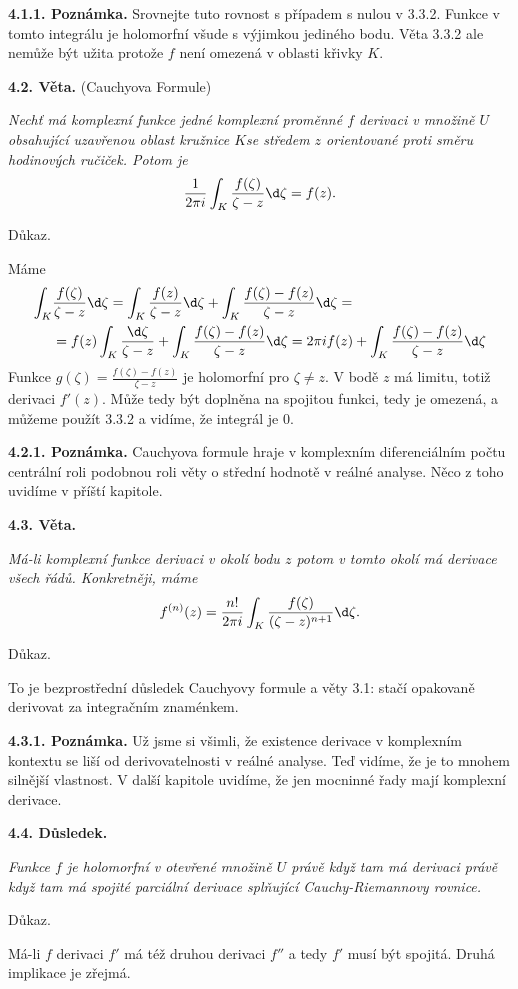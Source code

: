\documentclass[12pt]{article}
\begin{document}
\medskip

{\bf 4.1.1. Poznámka.} Srovnejte tuto rovnost s případem s nulou v 3.3.2. Funkce v tomto integrálu je holomorfní všude s výjimkou jediného bodu.  Věta 3.3.2 ale nemůže být užita protože $f$ není omezená v oblasti křivky $K$.

\bigskip

{\bf 4.2. Věta.} (Cauchyova Formule) {\em Nechť má komplexní funkce jedné komplexní proměnné $f$ derivaci v množině $U$ obsahující uzavřenou oblast kružnice $K$se středem $z$ orientované proti směru hodinových ručiček. Potom je
$$
\frac{1}{2\pi i}\int_K\frac{f(\zeta)}{\zeta-z}\d \zeta= f(z).
$$

Důkaz.}   Máme
$$
\begin{aligned}
\int_K&\frac{f(\zeta)}{\zeta-z}\d \zeta= 
\int_K\frac{f(z)}{\zeta-z}\d \zeta+\int_K\frac{f(\zeta)-f(z)}{\zeta-z}\d\zeta=\\
&=f(z)\int_K\frac{\d\zeta}{\zeta-z}+\int_K\frac{f(\zeta)-f(z)}{\zeta-z}\d\zeta=
2\pi i f(z)+\int_K\frac{f(\zeta)-f(z)}{\zeta-z}\d\zeta
\end{aligned}
$$
Funkce $g(\zeta)=\frac{f(\zeta)-f(z)}{\zeta-z}$
je holomorfní pro $\zeta\neq z$. V bodě $z$ má limitu,
totiž derivaci $f'(z)$. Může tedy být doplněna na spojitou funkci, tedy je omezená, a můžeme použít 3.3.2 a vidíme, že integrál je 0.\sq

\medskip

{\bf 4.2.1. Poznámka.} Cauchyova formule hraje v komplexním diferenciálním počtu centrální roli podobnou roli věty o střední hodnotě v reálné analyse. Něco z toho uvidíme v příští kapitole.

\bigskip

{\bf 4.3. Věta.} {\em Má-li komplexní funkce derivaci v okolí bodu $z$ potom v tomto okolí má derivace všech řádů. Konkretněji, máme
$$
f^{(n)}(z)=\frac{n!}{2\pi i}\int_K\frac{f(\zeta)}{(\zeta-z)^{n+1}}\d \zeta.
$$

Důkaz.} To je bezprostřední důsledek Cauchyovy formule a věty 3.1:
stačí opakovaně derivovat za integračním znaménkem.\sq
\medskip

{\bf 4.3.1. Poznámka.} Už jsme si všimli, že existence derivace v komplexním kontextu se liší od derivovatelnosti v reálné analyse. Teď vidíme, že  je to mnohem silnější vlastnost. V další kapitole uvidíme, že jen mocninné řady mají komplexní derivace.


\bigskip

{\bf 4.4. Důsledek.} {\em Funkce $f$ je holomorfní v otevřené množině $U$ právě když
tam má derivaci 
právě když tam má spojité parciální derivace splňující Cauchy-Riemannovy rovnice.

Důkaz.} Má-li $f$ derivaci $f'$ má též druhou derivaci $f''$ a tedy  $f'$ musí být spojitá. Druhá implikace je zřejmá.\sq
\end{document}
